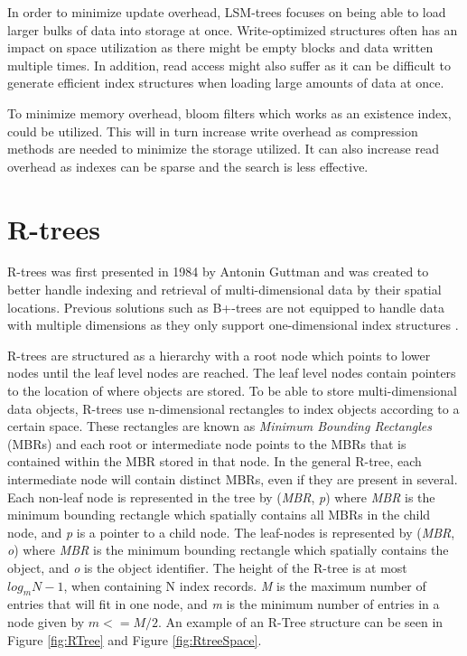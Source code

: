\noindent
In order to minimize update overhead, LSM-trees focuses on being able to load larger bulks of data into storage at once. Write-optimized structures often has an impact on space utilization as there might be empty blocks and data written multiple times. In addition, read access might also suffer as it can be difficult to generate efficient index structures when loading large amounts of data at once.\newline

\noindent
To minimize memory overhead, bloom filters which works as an existence index, could be utilized. This will in turn increase write overhead as compression methods are needed to minimize the storage utilized. It can also increase read overhead as indexes can be sparse and the search is less effective.

\section{R-trees}
R-trees was first presented in 1984 by Antonin Guttman\cite{r-tree} and was created to better handle indexing and retrieval of multi-dimensional data by their spatial locations. Previous solutions such as B+-trees are not equipped to handle data with multiple dimensions as they only support one-dimensional index structures \cite{ComparisonOfAdvancedTree}. \newline

\noindent
R-trees are structured as a hierarchy with a root node which points to lower nodes until the leaf level nodes are reached. The leaf level nodes contain pointers to the location of where objects are stored. To be able to store multi-dimensional data objects, R-trees use n-dimensional rectangles to index objects according to a certain space. These rectangles are known as \emph{Minimum Bounding Rectangles} (MBRs) and each root or intermediate node points to the MBRs that is contained within the MBR stored in that node. In the general R-tree, each intermediate node will contain distinct MBRs, even if they are present in several. Each non-leaf node is represented in the tree by (\emph{MBR},  \emph{p}) where \emph{MBR} is the minimum bounding rectangle which spatially contains all MBRs in the child node, and \emph{p} is a pointer to a child node. The leaf-nodes is represented by (\emph{MBR}, \emph{o}) where \emph{MBR} is the minimum bounding rectangle which spatially contains the object, and \emph{o} is the object identifier. The height of the R-tree is at most \(log_mN-1\), when containing N index records. \emph{M} is the maximum number of entries that will fit in one node, and \emph{m} is the minimum number of entries in a node given by \(m <= M/2\). An example of an R-Tree structure can be seen in Figure \ref{fig:RTree} and Figure \ref{fig:RtreeSpace}.

